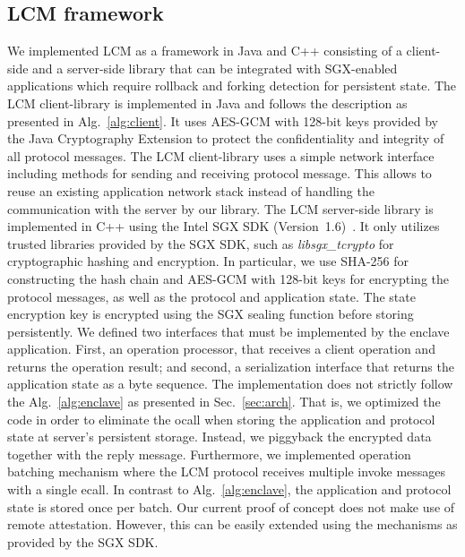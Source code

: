 \documentclass[11pt]{article}
\theoremstyle{plain-boldhead}
\theoremstyle{definition-boldhead}
\newcommand{\pp}{LCM\xspace}
\begin{document}
\subsection{\pp framework}


We implemented \pp as a framework in Java and C++ consisting of a
client-side and a server-side library that can be integrated with SGX-enabled
applications which require rollback and forking detection for persistent state.
% 
% 
% 
The LCM client-library is implemented in Java and follows the description as
presented in Alg.~\ref{alg:client}.  It uses AES-GCM with 128-bit keys
provided by the Java Cryptography Extension to protect the confidentiality and
integrity of all protocol messages.  The LCM client-library uses a simple
network interface including methods for sending and receiving protocol
message. This allows to reuse an existing application network stack instead of
handling the communication with the server by our library.
% 
% 
The LCM server-side library is implemented in C++ using the Intel \ac{SGX} SDK
(Version~1.6)~\cite{sgx-sdk-linux}.  It only utilizes trusted libraries
provided by the \ac{SGX} SDK, such as \emph{libsgx\_tcrypto} for cryptographic
hashing and encryption.  In particular, we use SHA-256 for constructing the
hash chain and AES-GCM with 128-bit keys for encrypting the protocol messages,
as well as the protocol and application state. The state encryption key is
encrypted using the \ac{SGX} sealing function before storing persistently.
% 
% 
We defined two interfaces that must be implemented by the enclave application.
First, an operation processor, that receives a client operation and returns the
operation result; and second, a serialization interface that returns the
application state as a byte sequence.
% 
% 
The implementation does not strictly follow the Alg.~\ref{alg:enclave} as
presented in Sec.~\ref{sec:arch}. That is, we optimized the code in order
to eliminate the ocall when storing the application and protocol state at
server's persistent storage.  Instead, we piggyback the encrypted data
together with the reply message.
% 
Furthermore, we implemented operation batching mechanism where the LCM
protocol receives multiple invoke messages with a single ecall.  In contrast
to Alg.~\ref{alg:enclave}, the application and protocol state is stored
once per batch.
% 
Our current proof of concept does not make use of remote attestation. 
However, this can be easily extended using the mechanisms as
provided by the \ac{SGX} SDK. 
\end{document}
